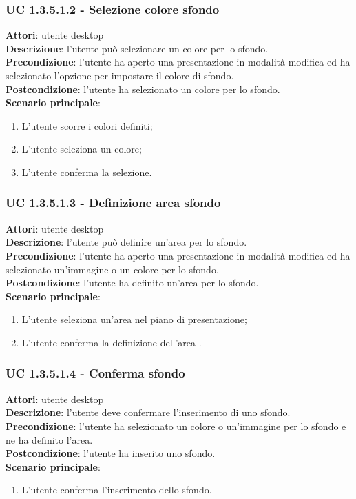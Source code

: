 \subsubsection{UC 1.3.5.1.2 - Selezione colore sfondo}{
	\label{uc1.3.5.1.2}
	\textbf{Attori}: utente desktop \\
	\textbf{Descrizione}: l'utente può selezionare un colore per lo sfondo. \\
	\textbf{Precondizione}: l'utente ha aperto una presentazione in modalità modifica ed ha selezionato l'opzione per impostare il colore di sfondo.	\\
	\textbf{Postcondizione}: l'utente ha selezionato un colore per lo sfondo.	\\
	\textbf{Scenario principale}:
	\begin{enumerate}
		\item L'utente scorre i colori definiti;
		\item L'utente seleziona un colore;
		\item L'utente conferma la selezione.
	\end{enumerate}
}
\subsubsection{UC 1.3.5.1.3 - Definizione area sfondo}{
	\label{uc1.3.5.1.3}
	\textbf{Attori}: utente desktop \\
	\textbf{Descrizione}: l'utente può definire un'area per lo sfondo. \\
	\textbf{Precondizione}: l'utente ha aperto una presentazione in modalità modifica ed ha selezionato un'immagine o un colore per lo sfondo.	\\
	\textbf{Postcondizione}: l'utente ha definito un'area per lo sfondo.	\\
	\textbf{Scenario principale}:
	\begin{enumerate}
		\item L'utente seleziona un'area nel piano di presentazione;
		\item L'utente conferma la definizione dell'area .
	\end{enumerate}
}
\subsubsection{UC 1.3.5.1.4 - Conferma sfondo}{
	\label{uc1.3.5.1.4}
	\textbf{Attori}: utente desktop \\
	\textbf{Descrizione}: l'utente deve confermare l'inserimento di uno sfondo. \\
	\textbf{Precondizione}: l'utente ha selezionato un colore o un'immagine per lo sfondo e ne ha definito l'area.	\\
	\textbf{Postcondizione}: l'utente ha inserito uno sfondo.	\\
	\textbf{Scenario principale}:
	\begin{enumerate}
		\item L'utente conferma l'inserimento dello sfondo.
	\end{enumerate}
}
